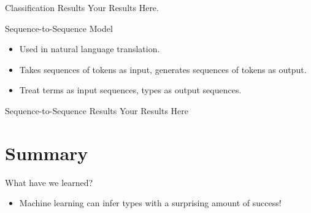 \documentclass[17pt]{beamer}
\begin{document}
\begin{frame}{Classification Results}
  Your Results Here.
\end{frame}

\begin{frame}{Sequence-to-Sequence Model}
  \begin{itemize}
  \item Used in natural language translation.
  \item Takes sequences of tokens as input, generates sequences of
    tokens as output.
  \item Treat terms as input sequences, types as output sequences.
  \end{itemize}
\end{frame}

\begin{frame}{Sequence-to-Sequence Results}
  Your Results Here
\end{frame}

\section{Summary}

\begin{frame}{What have we learned?}
  \begin{itemize}
  \item Machine learning can infer types with a surprising amount of
    success!
  \end{itemize}
\end{frame}
\end{document}
